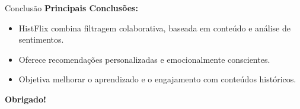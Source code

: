 \documentclass{beamer}
\begin{document}
\begin{frame}{Conclusão}
    \textbf{Principais Conclusões:}
    \begin{itemize}
        \item HistFlix combina filtragem colaborativa, baseada em conteúdo e análise de sentimentos.
        \item Oferece recomendações personalizadas e emocionalmente conscientes.
        \item Objetiva melhorar o aprendizado e o engajamento com conteúdos históricos.
    \end{itemize}
    \vspace{0.5cm}
    \textbf{Obrigado!}
    \vspace{0.5cm}
\end{frame}
\end{document}
